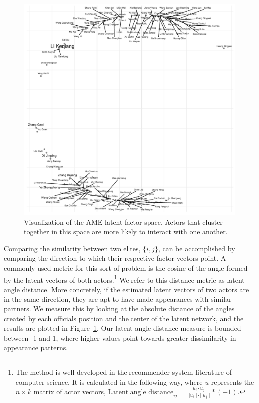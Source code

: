 \documentclass[11pt,english]{article}
\begin{document}
\begin{flushleft}
\noindent \begin{center}
\begin{figure}[H]
\noindent \begin{centering}
\includegraphics[width=5in]{uViz}
\par\end{centering}
\caption{Visualization of the AME latent factor space. Actors that cluster together in this space are more likely
to interact with one another.}
\label{fig:uv}
\end{figure}
\par\end{center}

Comparing the similarity between two elites, $\{i,j\}$, can be accomplished by comparing the direction to which their respective factor vectors point. A commonly used metric for this sort of problem is the cosine of the angle formed by the latent vectors of both actors.\footnote{The method is well developed in the recommender system literature of computer science. It is calculated in the following way, where $u$ represents the $n\times k$ matrix of actor vectors, $\text{Latent angle distance}_{ij}=\frac{u_{i}\cdot u_{j}}{||u_{i}||\cdot||u_{j}||}*(-1)$. } We refer to this distance metric as latent angle distance. More concretely, if the estimated latent vectors of two actors are in the same direction, they are apt to have made appearances with similar partners. We measure this by looking at the absolute distance of the angles created by each officials position and the center of the latent network, and the results are plotted in Figure~\ref{fig:uv}. Our latent angle distance measure is bounded between -1 and 1, where higher values point towards greater dissimilarity in appearance patterns.


\end{flushleft}
\end{document}

